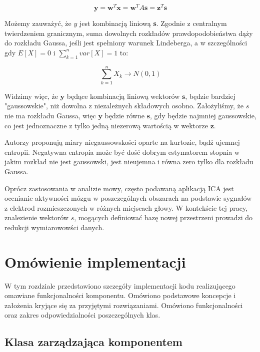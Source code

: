 \documentclass[oneside, eng]{mgr}
\newcommand{\bb}{\textbf}
\begin{document}
\begin{equation}
	\bb{y} = \bb{w}^T \bb{x} = \bb{w}^T A \bb{s} = \bb{z}^T \bb{s} 
\end{equation}

Możemy zauważyć, że $y$ jest kombinacją liniową \bb{s}. Zgodnie z centralnym twierdzeniem granicznym, suma dowolnych rozkładów prawdopodobieństwa dąży do rozkładu Gaussa, jeśli jest spełniony warunek Lindeberga, a w szczególności gdy $E[X] = 0$ i $\sum_{k=1}^{n}var[X] = 1$ to:

\begin{equation}
	\sum_{k=1}^{n} X_k \to N(0,1)
\end{equation}

Widzimy więc, że $\bb{y}$ będące kombinacją liniową wektorów $\bb{s}$, będzie bardziej "gaussowskie", niż dowolna z niezależnych składowych osobno. Założyliśmy, że $s$ nie ma rozkładu Gaussa, więc $\bb{y}$ będzie równe $\bb{s}$, gdy będzie najmniej gaussowskie, co jest jednoznaczne z tylko jedną niezerową wartością w wektorze $\bb{z}$.

Autorzy \cite{ICA} proponują miary niegaussowskości oparte na kurtozie, bądź ujemnej entropii. Negatywna entropia może być dość dobrym estymatorem stopnia w jakim rozkład nie jest gaussowski, jest nieujemna i równa zero tylko dla rozkładu Gaussa.


Oprócz zastosowania w analizie mowy, często podawaną aplikacją ICA jest ocenianie aktywności mózgu w poszczególnych obszarach na podstawie sygnałów z elektrod rozmieszczonych w różnych miejscach głowy. W kontekście tej pracy, znalezienie wektorów $s$, mogących definiować bazę nowej przestrzeni prowadzi do redukcji wymiarowowści danych.

\newpage


\chapter{Omówienie implementacji}

W tym rozdziale przedstawiono szczegóły implementacji kodu realizującego omawiane funkcjonalności komponentu. Omówiono podstawowe koncepcje i założenia kryjące się za przyjętymi rozwiązaniami. Omówiono funkcjonalności oraz zakres odpowiedzialności poszczególnych klas.

\section{Klasa zarządzająca komponentem}
\end{document}
